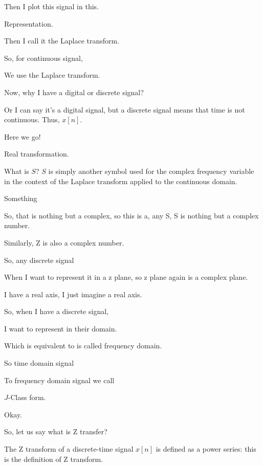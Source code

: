 \documentclass{article}
\begin{document}
Then I plot this signal in this.

Representation.

Then I call it the Laplace transform.

So, for continuous signal,

We use the Laplace transform.

Now, why I have a digital or discrete signal?

Or I can say it's a digital signal, but a discrete signal means that time is not continuous. Thus, $x[n]$.

Here we go!

Real transformation.

What is $S$? $S$ is simply another symbol used for the complex frequency variable in the context of the Laplace transform applied to the continuous domain.

Something

So, that is nothing but a complex, so this is a, any S, S is nothing but a complex number.

Similarly, Z is also a complex number.

So, any discrete signal

When I want to represent it in a z plane, so z plane again is a complex plane.

I have a real axis, I just imagine a real axis.

So, when I have a discrete signal,

I want to represent in their domain.

Which is equivalent to is called frequency domain.

So time domain signal

To frequency domain signal we call

$J$-Class form.



Okay.

So, let us say what is Z transfer?

The Z transform of a discrete-time signal $x[n]$ is defined as a power series: this is the definition of Z transform.
\end{document}
